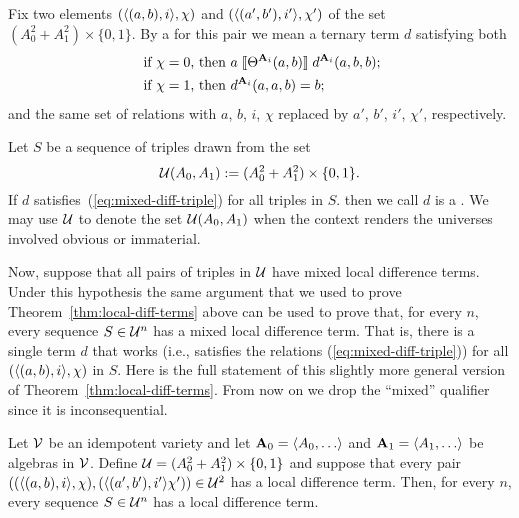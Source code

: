 Fix two elements $(\langle(a, b),i\rangle, \chi)$ and $(\langle(a', b'),i'\rangle, \chi')$ of the
set $(A_0^2 + A_1^2) \times \{0,1\}$.
By a  for this pair
we mean a ternary term $d$ satisfying both
\begin{align}
\text{ if $\chi=0$, then } & a \comr{\Cg^{\bA_i}(a,b)} d^{\bA_i}(a,b,b); \label{eq:mixed-diff-triple}\\
\text{ if $\chi=1$, then } &d^{\bA_i}(a,a,b) = b; \nonumber
\end{align}
and the same set of relations with $a$, $b$, $i$, $\chi$ replaced 
by $a'$, $b'$, $i'$, $\chi'$, respectively.

Let $S$ be a sequence of triples drawn from the set
\[
\mathcal{U}(A_0, A_1)  := (A_0^2 + A_1^2) \times \{0,1\}.
\]
If $d$ satisfies~(\ref{eq:mixed-diff-triple}) for all triples in $S$.
then we call $d$ is a .
We may use $\mathcal{U}$ to denote the set $\mathcal{U}(A_0, A_1)$ when the context renders the
universes involved obvious or immaterial.

Now, suppose that all pairs of triples 
in $\mathcal{U}$ have mixed local difference terms.
Under this hypothesis the same argument that we used to prove
Theorem~\ref{thm:local-diff-terms} above can be used to prove that, for every $n$,
every sequence $S\in \mathcal{U}^n$ has a mixed local difference term.
That is, there is a single term $d$ that works (i.e., satisfies
the relations (\ref{eq:mixed-diff-triple})) for all $(\langle(a, b), i\rangle,\chi)$ in $S$.
Here is the full statement of this slightly more general version of
Theorem~\ref{thm:local-diff-terms}.
From now on we drop the ``mixed'' qualifier since
it is inconsequential.

\begin{thm} %
  \label{thm:mixed-local-diff-terms}
  Let $\mathcal{V}$ be an idempotent variety and let
  $\bA_0 = \<A_0, \dots\>$ and   $\bA_1 = \<A_1, \dots\>$ be algebras in $\mathcal{V}$. Define
  $\mathcal{U}  = (A_0^2 + A_1^2)\times \{0,1\}$
  and suppose that every pair
  $((\langle(a, b), i\rangle, \chi), (\langle(a', b'), i'\rangle\chi')) \in \mathcal{U}^2$
  has a local difference term. Then, for every $n$, every sequence $S \in \mathcal{U}^n$
  has a local difference term.
\end{thm}

